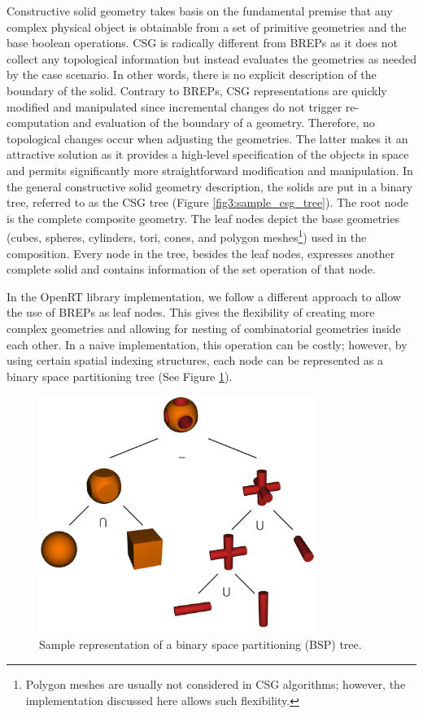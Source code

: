 \documentclass[a4paper,11pt,oneside]{article}
\begin{document}
Constructive solid geometry takes basis on the fundamental premise that any complex physical object is obtainable from a set of primitive geometries and the base boolean operations. CSG is radically different from BREPs as it does not collect any topological information but instead evaluates the geometries as needed by the case scenario. In other words, there is no explicit description of the boundary of the solid. Contrary to BREPs,  CSG representations are quickly modified and manipulated since incremental changes do not trigger re-computation and evaluation of the boundary of a geometry. Therefore, no topological changes occur when adjusting the geometries. The latter makes it an attractive solution as it provides a high-level specification of the objects in space and permits significantly more straightforward modification and manipulation. In the general constructive solid geometry description, the solids are put in a binary tree, referred to as the CSG tree (Figure \ref{fig3:sample_csg_tree}). The root node is the complete composite geometry. The leaf nodes depict the base geometries (cubes, spheres, cylinders, tori, cones, and polygon meshes\footnote{Polygon meshes are usually not considered in CSG algorithms; however, the implementation discussed here allows such flexibility.}) used in the composition. Every node in the tree, besides the leaf nodes, expresses another complete solid and contains information of the set operation of that node.
    
In the OpenRT library implementation, we follow a different approach to allow the use of BREPs as leaf nodes. This gives the flexibility of creating more complex geometries and allowing for nesting of combinatorial geometries inside each other. In a naive implementation, this operation can be costly; however, by using certain spatial indexing structures, each node can be represented as a binary space partitioning tree (See Figure \ref{fig4:sample_bsp_tree}).
  
\begin{figure}[ht]
	\begin{center}
		\includegraphics[width=0.8\textwidth]{section1/sample-csg-tree.png}
	\end{center}
	\caption{Sample representation of a binary space partitioning (BSP) tree.}
	\label{fig4:sample_bsp_tree}
\end{figure}
  
\end{document}

